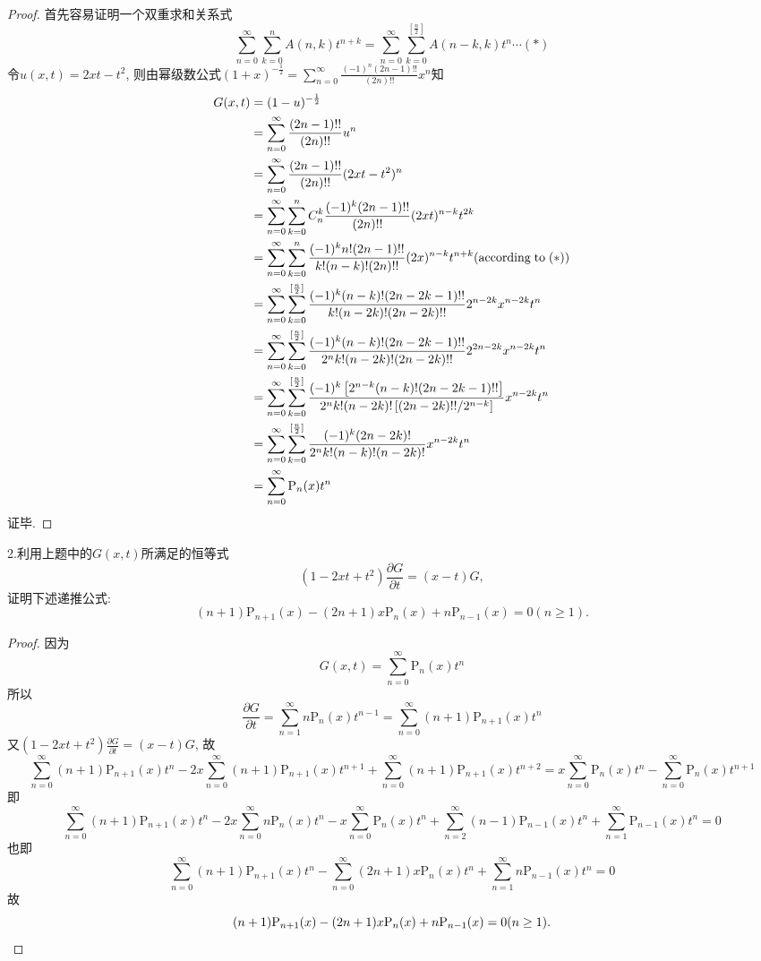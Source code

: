 \begin{proof} 
首先容易证明一个双重求和关系式
\[\sum_{n=0}^{\infty}\sum_{k=0}^nA(n,k)t^{n+k}=\sum_{n=0}^{\infty}\sum_{k=0}^{[\frac{n}{2}]}A(n-k,k)t^n\cdots(*)\]
令$u(x,t)=2xt-t^2$, 则由幂级数公式$(1+x)^{-\frac{1}{2}}=\sum_{n=0}^{\infty}\frac{(-1)^n(2n-1)!!}{(2n)!!}x^n$知
\[\begin{split}
G(x,t)&=(1-u)^{-\frac{1}{2}}\\
&=\sum_{n=0}^{\infty}\frac{(2n-1)!!}{(2n)!!}u^n\\
&=\sum_{n=0}^{\infty}\frac{(2n-1)!!}{(2n)!!}(2xt-t^2)^n\\
&=\sum_{n=0}^{\infty}\sum_{k=0}^nC_n^k\frac{(-1)^k(2n-1)!!}{(2n)!!}(2xt)^{n-k}t^{2k}\\
&=\sum_{n=0}^{\infty}\sum_{k=0}^n\frac{(-1)^kn!(2n-1)!!}{k!(n-k)!(2n)!!}(2x)^{n-k}t^{n+k}(\textrm{according\;to}\;(*))\\
&=\sum_{n=0}^{\infty}\sum_{k=0}^{[\frac{n}{2}]}\frac{(-1)^k(n-k)!(2n-2k-1)!!}{k!(n-2k)!(2n-2k)!!}2^{n-2k}x^{n-2k}t^n\\
&=\sum_{n=0}^{\infty}\sum_{k=0}^{[\frac{n}{2}]}\frac{(-1)^k(n-k)!(2n-2k-1)!!}{2^nk!(n-2k)!(2n-2k)!!}2^{2n-2k}x^{n-2k}t^n\\
&=\sum_{n=0}^{\infty}\sum_{k=0}^{[\frac{n}{2}]}\frac{(-1)^k\left[2^{n-k}(n-k)!(2n-2k-1)!!\right]}{2^nk!(n-2k)!\left[(2n-2k)!!/2^{n-k}\right]}x^{n-2k}t^n\\
&=\sum_{n=0}^{\infty}\sum_{k=0}^{[\frac{n}{2}]}\frac{(-1)^k(2n-2k)!}{2^nk!(n-k)!(n-2k)!}x^{n-2k}t^n\\
&=\sum_{n=0}^{\infty}\mathrm{P}_n(x)t^n
\end{split}\]
证毕.
\end{proof}


2.利用上题中的$G(x,t)$所满足的恒等式
\[(1-2xt+t^2)\frac{\partial G}{\partial t}=(x-t)G,\]
证明下述递推公式:
\[(n+1)\mathrm{P}_{n+1}(x)-(2n+1)x\mathrm{P}_n(x)+n\mathrm{P}_{n-1}(x)=0(n\geq1).\]

\begin{proof} 因为\[G(x,t)=\sum_{n=0}^{\infty}\mathrm{P}_n(x)t^n\]
所以\[\frac{\partial G}{\partial t}=\sum_{n=1}^{\infty}n\mathrm{P}_n(x)t^{n-1}=\sum_{n=0}^{\infty}(n+1)\mathrm{P}_{n+1}(x)t^n\]
又$(1-2xt+t^2)\frac{\partial G}{\partial t}=(x-t)G$, 故
\[\sum_{n=0}^{\infty}(n+1)\mathrm{P}_{n+1}(x)t^n-2x\sum_{n=0}^{\infty}(n+1)\mathrm{P}_{n+1}(x)t^{n+1}+\sum_{n=0}^{\infty}(n+1)\mathrm{P}_{n+1}(x)t^{n+2}=x\sum_{n=0}^{\infty}\mathrm{P}_n(x)t^n-\sum_{n=0}^{\infty}\mathrm{P}_n(x)t^{n+1}\]
即
\[\sum_{n=0}^{\infty}(n+1)\mathrm{P}_{n+1}(x)t^n-2x\sum_{n=0}^{\infty}n\mathrm{P}_n(x)t^n-x\sum_{n=0}^{\infty}\mathrm{P}_n(x)t^n+\sum_{n=2}^{\infty}(n-1)\mathrm{P}_{n-1}(x)t^n+\sum_{n=1}^{\infty}\mathrm{P}_{n-1}(x)t^n=0\]
也即
\[\sum_{n=0}^{\infty}(n+1)\mathrm{P}_{n+1}(x)t^n-\sum_{n=0}^{\infty}(2n+1)x\mathrm{P}_n(x)t^n+\sum_{n=1}^{\infty}n\mathrm{P}_{n-1}(x)t^n=0\]
故
\[(n+1)\mathrm{P}_{n+1}(x)-(2n+1)x\mathrm{P}_n(x)+n\mathrm{P}_{n-1}(x)=0(n\geq1).\qedhere\]
\end{proof}


